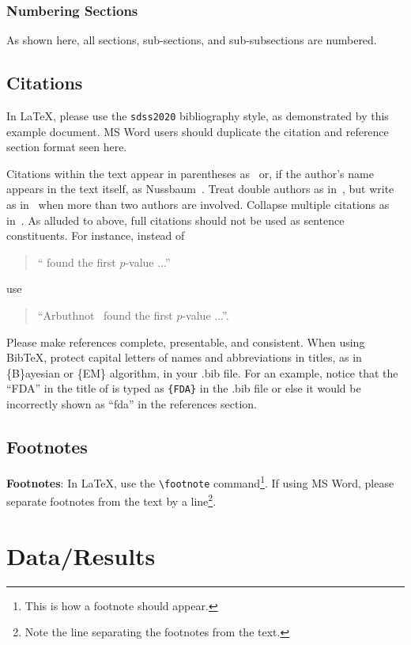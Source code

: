 \documentclass[10pt]{article}
\begin{document}
\subsubsection{Numbering Sections}
As shown here, all sections, sub-sections, and sub-subsections are numbered.

\subsection{Citations}

In \LaTeX, please use the
{\tt sdss2020} bibliography style, as demonstrated by this example document.
MS Word users should duplicate the citation and reference section format seen here.

Citations within the text appear in parentheses
as~\cite{Nussbaum2018} or, if the author's name appears in the text
itself, as Nussbaum~.  Treat double authors as
in~\cite{Wasserstein2016}, but write as in~\cite{Brunner} when more than two
authors are involved. Collapse multiple citations as
in~\cite{LaVange2019,Wasserstein2016}.  As alluded to above, full citations should not
be used as sentence constituents.  For instance, instead of
\begin{quote}
  ``\cite{Arbuthnot1710} found the first $p$-value ...''
\end{quote}
use
\begin{quote}
``Arbuthnot~ found the first $p$-value ...''.
\end{quote}
Please make references complete, presentable, and
consistent. When using Bib\TeX, protect capital letters of names and
abbreviations in titles, as in \{B\}ayesian or \{EM\} algorithm,
in your .bib file.  For an example, notice that the ``FDA'' in
the title of \cite{LaVange2019} is typed as \verb+{FDA}+ in the .bib file
or else it would be incorrectly shown as ``fda'' in the references section.


\subsection{Footnotes}

{\bf Footnotes}: In \LaTeX, use the \verb+\footnote+
command\footnote{This is how a footnote should appear.}. If using
MS Word, please separate footnotes
from the text by a line\footnote{Note the line
separating the footnotes from the text.}.

\section{Data/Results}
\end{document}
